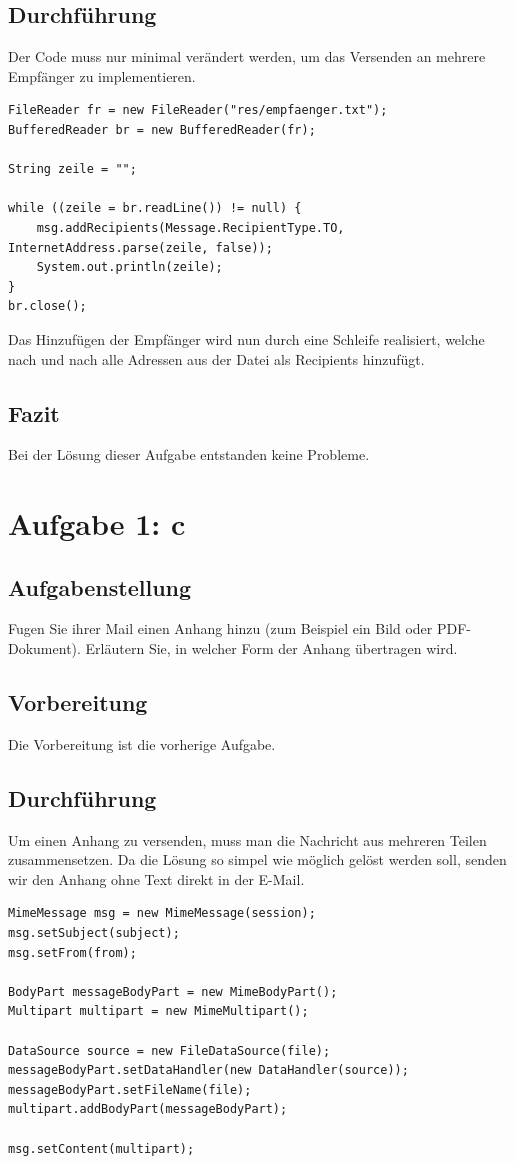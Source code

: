 \subsection{Durchführung}
Der Code muss nur minimal verändert werden, um das Versenden an mehrere Empfänger zu implementieren.

\lstset{language=Java}
\begin{lstlisting}
FileReader fr = new FileReader("res/empfaenger.txt");
BufferedReader br = new BufferedReader(fr);

String zeile = "";

while ((zeile = br.readLine()) != null) {
	msg.addRecipients(Message.RecipientType.TO, InternetAddress.parse(zeile, false));
	System.out.println(zeile);
}
br.close();
\end{lstlisting}

Das Hinzufügen der Empfänger wird nun durch eine Schleife realisiert, welche nach und nach alle Adressen aus der Datei als Recipients hinzufügt.

\subsection{Fazit}
Bei der Lösung dieser Aufgabe entstanden keine Probleme.

\section{Aufgabe 1: c}
\subsection{Aufgabenstellung}
Fugen Sie ihrer Mail einen Anhang hinzu (zum Beispiel ein Bild oder PDF-Dokument). Erläutern Sie, in welcher Form der Anhang übertragen wird.

\subsection{Vorbereitung}
Die Vorbereitung ist die vorherige Aufgabe.

\subsection{Durchführung}
Um einen Anhang zu versenden, muss man die Nachricht aus mehreren Teilen zusammensetzen. Da die Lösung so simpel wie möglich gelöst werden soll, senden wir den Anhang ohne Text direkt in der E-Mail.

\lstset{language=Java}
\begin{lstlisting}
MimeMessage msg = new MimeMessage(session);
msg.setSubject(subject);
msg.setFrom(from);

BodyPart messageBodyPart = new MimeBodyPart();
Multipart multipart = new MimeMultipart();

DataSource source = new FileDataSource(file);
messageBodyPart.setDataHandler(new DataHandler(source));
messageBodyPart.setFileName(file);
multipart.addBodyPart(messageBodyPart);

msg.setContent(multipart);
\end{lstlisting}

